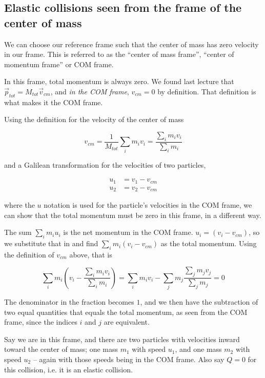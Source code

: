 \subsection{Elastic collisions seen from the frame of the center of mass}

We can choose our reference frame such that the center of mass has zero velocity in our frame. This is referred to as the ``center of mass frame'', ``center of momentum frame'' or COM frame.

In this frame, total momentum is always zero. We found last lecture that $\vec{p}_{tot} = M_{tot} \vec{v}_{cm}$, and \emph{in the COM frame}, $v_{cm} = 0$ by definition. That definition is what makes it the COM frame.

Using the definition for the velocity of the center of mass

\begin{equation}
v_{cm} = \frac{1}{M_{tot}} \sum_i m_i v_i = \frac{\sum_i m_i v_i}{\sum_i m_i}
\end{equation}

and a Galilean transformation for the velocities of two particles,

\begin{align}
u_1 &= v_1 - v_{cm}\\
u_2 &= v_2 - v_{cm}
\end{align}

where the $u$ notation is used for the particle's velocities in the COM frame, we can show that the total momentum must be zero in this frame, in a different way.

The sum $\sum_i m_i u_i$ is the net momentum in the COM frame. $u_i = (v_i - v_{cm})$, so we substitute that in and find $\sum_i m_i (v_i - v_{cm})$ as the total momentum. Using the definition of $v_{cm}$ above, that is

\begin{equation}
\sum_i m_i \left(v_i - \frac{\sum_i m_i v_i}{\sum_i m_i}\right) = \sum_i m_i v_i - \sum_j m_j \frac{\sum_j m_j v_j}{\sum_j m_j} = 0
\end{equation}

The denominator in the fraction becomes $1$, and we then have the subtraction of two equal quantities that equals the total momentum, as seen from the COM frame, since the indices $i$ and $j$ are equivalent.

Say we are in this frame, and there are two particles with velocities inward toward the center of mass; one mass $m_1$ with speed $u_1$, and one mass $m_2$ with speed $u_2$ -- again with those speeds being in the COM frame. Also say $Q = 0$ for this collision, i.e. it is an elastic collision.

